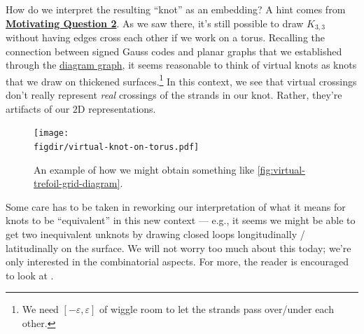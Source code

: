 How do we interpret the resulting ``knot'' as an embedding? A hint
comes from \hyperlink{question-2}{\textbf{Motivating Question 2}}. As
we saw there, it's still possible to draw $K_{3,3}$ without having
edges cross each other if we work on a torus. Recalling the connection
between signed Gauss codes and planar graphs that we established
through the \hyperlink{def:diagram-graph}{diagram graph}, it seems
reasonable to think of virtual knots as knots that we draw on
thickened surfaces.\footnote{We need $[-\varepsilon, \varepsilon]$ of
  wiggle room to let the strands pass over/under each other.} In this
context, we see that virtual crossings don't really represent
\emph{real} crossings of the strands in our knot. Rather, they're
artifacts of our $2$D representations.
\begin{figure}[H]
  \centering
  \texttt{[image: \\figdir/virtual-knot-on-torus.pdf]}
  \caption{An example of how we might obtain something like
    \cref{fig:virtual-trefoil-grid-diagram}.}
  \label{fig:virtual-knot-on-torus}
\end{figure}
Some care has to be taken in reworking our interpretation of what it
means for knots to be ``equivalent'' in this new context --- e.g., it
seems we might be able to get two inequivalent unknots by drawing
closed loops longitudinally / latitudinally on the surface. We will
not worry too much about this today; we're only interested in the
combinatorial aspects. For more, the reader is encouraged to look at
\cite{Carter2002May}.

